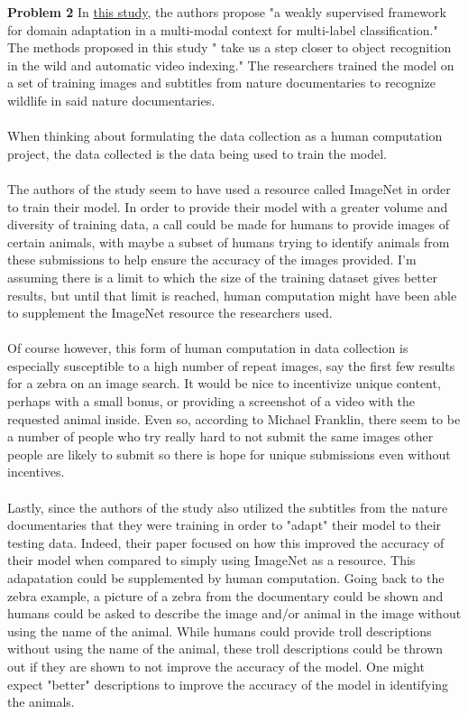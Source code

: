 \documentclass[letterpaper,12pt]{article}
\theoremstyle{definition}
\begin{document}
\noindent\textbf{Problem 2}
In \href{http://proxy.uchicago.edu/login?url=http://search.ebscohost.com/login.aspx?direct=true&db=a9h&AN=117836513&site=eds-live&scope=site}{this study}, the 
authors propose "a weakly supervised framework for domain adaptation in a multi-modal
context for multi-label classification." The methods proposed in this study "
take us a step closer to object recognition in the wild and automatic video 
indexing." The researchers trained the model on a set of training images and
subtitles from nature documentaries to recognize wildlife in said nature 
documentaries.
\\
\\
When thinking about formulating the data collection as a human computation 
project, the data collected is the data being used to train the model.
\\
\\
The authors of the study seem to have used a resource called ImageNet
in order to train their model. In order to provide their model with a greater volume
and diversity of training data, a call could be made for humans to provide images
 of certain animals, with maybe a subset of humans trying to identify animals
from these submissions to help ensure the accuracy of the images provided. I'm
assuming there is a limit to which the size of the training dataset gives better
results, but until that limit is reached, human computation might have been able
to supplement the ImageNet resource the researchers used.
\\
\\
Of course however, this form of human computation in data collection is especially
susceptible to a high number of repeat images, say the first few results for a 
zebra on an image search. It would be nice to incentivize unique content, perhaps
with a small bonus, or providing a screenshot of a video with the requested animal
inside. Even so, according to Michael Franklin, there seem to be a number of people
who try really hard to not submit the same images other people are likely to submit
so there is hope for unique submissions even without incentives.
\\
\\
Lastly, since the authors of the study also utilized the subtitles from the nature 
documentaries that they were training in order to "adapt" their model to their 
testing data. Indeed, their paper focused on how this improved the accuracy of 
their model when compared to simply using ImageNet as a resource. This 
adapatation could be supplemented by human computation. Going back to the 
zebra example, a picture of a zebra from the documentary could be shown and humans
could be asked to describe the image and/or animal in the image without using 
the name of the animal. While humans could provide troll descriptions 
without using the name of the animal, these troll descriptions could be thrown out
if they are shown to not improve the accuracy of the model. One might 
expect "better" descriptions to improve the accuracy of the model in identifying
the animals.
\end{document}
